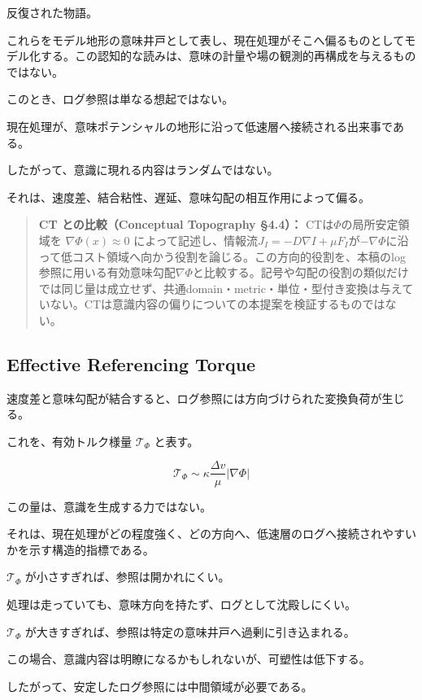 反復された物語。

これらをモデル地形の意味井戸として表し、現在処理がそこへ偏るものとしてモデル化する。この認知的な読みは、意味の計量や場の観測的再構成を与えるものではない。

このとき、ログ参照は単なる想起ではない。

現在処理が、意味ポテンシャルの地形に沿って低速層へ接続される出来事である。

したがって、意識に現れる内容はランダムではない。

それは、速度差、結合粘性、遅延、意味勾配の相互作用によって偏る。

\begin{quote}
\textbf{CT との比較（Conceptual Topography §4.4）：} CTは$\Phi$の局所安定領域を $\nabla\Phi(x)\approx 0$ によって記述し、情報流$J_I = -D\nabla I + \mu F_I$が$-\nabla\Phi$に沿って低コスト領域へ向かう役割を論じる。この方向的役割を、本稿のlog参照に用いる有効意味勾配$\nabla\Phi$と比較する。記号や勾配の役割の類似だけでは同じ量は成立せず、共通domain・metric・単位・型付き変換は与えていない。CTは意識内容の偏りについての本提案を検証するものではない。
\end{quote}

\subsection{Effective Referencing Torque}

速度差と意味勾配が結合すると、ログ参照には方向づけられた変換負荷が生じる。

これを、有効トルク様量 $\mathcal{T}_{\Phi}$ と表す。

\begin{equation}
\mathcal{T}_{\Phi}
\sim
\kappa
\frac{\Delta v}{\mu}
|\nabla \Phi|
\end{equation}

この量は、意識を生成する力ではない。

それは、現在処理がどの程度強く、どの方向へ、低速層のログへ接続されやすいかを示す構造的指標である。

$\mathcal{T}_{\Phi}$ が小さすぎれば、参照は開かれにくい。

処理は走っていても、意味方向を持たず、ログとして沈殿しにくい。

$\mathcal{T}_{\Phi}$ が大きすぎれば、参照は特定の意味井戸へ過剰に引き込まれる。

この場合、意識内容は明瞭になるかもしれないが、可塑性は低下する。

したがって、安定したログ参照には中間領域が必要である。


